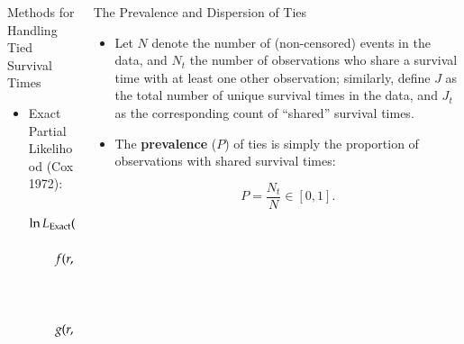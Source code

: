 \documentclass[structurebold,final,hyperref=pdftex,bookmarks,colorlinks,breaklinks]{beamer}
\begin{document}
\begin{frame}
\begin{columns}[t]
\begin{column}{0.24\linewidth}
\begin{block}{Methods for Handling Tied Survival Times}
\begin{itemize}
      \vspace{2 mm}

      \item Exact Partial Likelihood (Cox 1972):
      \begin{align*}
      \ln L_{\text{Exact}}(\beta) & =  \sum_{j=1}^{J} \left\{  \sum_{i \in R_{j}} \delta_{ij} ({\bf X}_{i} \beta) - \ln [f(r_{j},d_{j})] \right\}, ~ \text{where} \\
      f(r,d) & = g(r-1,d) + g(r-1,d-1) \exp({\bf X}_{k} \beta), \\
      k & = r\text{th observation in}~ R_{j}, \\
      r_{j} &= \text{cardinality of}~ R_{j},~\text{and} \\
      g(r,d) & = \begin{cases}
                  0~\text{if}~ r<d, \\
                  1~\text{if}~ d=0
                  \end{cases} 
      \end{align*}

      \end{itemize}

      \end{block}



    \end{column}%

    \begin{column}{0.24\linewidth}


    \begin{block}{The Prevalence and Dispersion of Ties}
    \begin{itemize}
        \item Let $N$ denote the number of (non-censored) events in the data, and $N_{t}$ the number of observations who share a survival time with at least one other observation; similarly, define $J$ as the total number of unique survival times in the data, and $J_{t}$ as the corresponding count of ``shared'' survival times.
        \vspace{2mm}
        \item The \textbf{prevalence} ($P$) of ties is simply the proportion of observations with shared survival times:

        \begin{equation*}
            P = \frac{N_{t}}{N} \in [0,1].
        \end{equation*}
        \vspace{2mm}


\end{itemize}
\end{block}
\end{column}
\end{columns}
\end{frame}
\end{document}
